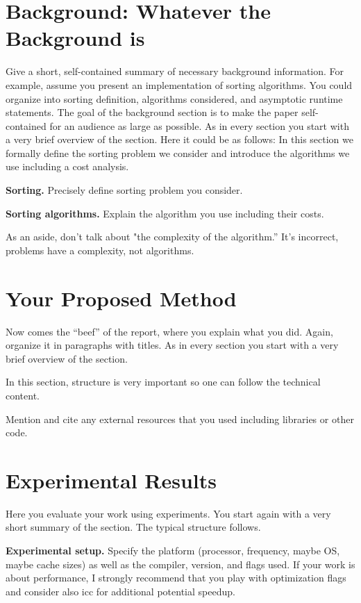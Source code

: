 \documentclass[sigconf]{acmart}
\newcommand{\mypar}[1]{{\bf #1.}}
\begin{document}
\section{Background: Whatever the Background is}\label{sec:background}

Give a short, self-contained summary of necessary background information. For
example, assume you present an implementation of sorting algorithms. You could
organize into sorting definition, algorithms considered, and asymptotic runtime
statements. The goal of the background section is to make the paper
self-contained for an audience as large as possible. As in every section you
start with a very brief overview of the section. Here it could be as follows:
In this section we formally define the sorting problem we consider and
introduce the algorithms we use including a cost analysis.

\mypar{Sorting}
Precisely define sorting problem you consider.

\mypar{Sorting algorithms}
Explain the algorithm you use including their costs.

As an aside, don't talk about "the complexity of the algorithm.'' It's
incorrect, problems have a complexity, not algorithms.

\section{Your Proposed Method}\label{sec:yourmethod}

Now comes the ``beef'' of the report, where you explain what you did. Again,
organize it in paragraphs with titles. As in every section you start with a
very brief overview of the section.

In this section, structure is very important so one can follow the technical
content.

Mention and cite any external resources that you used including libraries or
other code.

\section{Experimental Results}\label{sec:exp}

Here you evaluate your work using experiments. You start again with a very
short summary of the section. The typical structure follows.

\mypar{Experimental setup} Specify the platform (processor, frequency, maybe OS, maybe cache sizes)
as well as the compiler, version, and flags used. If your work is about performance,
I strongly recommend that you play with optimization flags and consider also icc for additional potential speedup.
\end{document}
